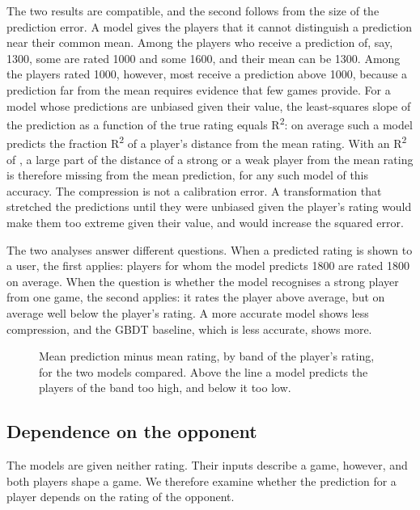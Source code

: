 \documentclass[11pt]{article}
\begin{document}
The two results are compatible, and the second follows from the size of the
prediction error. A model gives the players that it cannot distinguish a
prediction near their common mean. Among the players who receive a prediction
of, say, 1300, some are rated 1000 and some 1600, and their mean can be 1300.
Among the players rated 1000, however, most receive a prediction above 1000,
because a prediction far from the mean requires evidence that few games
provide. For a model whose predictions are unbiased given their value, the
least-squares slope of the prediction as a function of the true rating equals
R\textsuperscript{2}: on average such a model predicts the fraction
R\textsuperscript{2} of a player's distance from the mean rating. With an
R\textsuperscript{2} of , a large part of the distance of a strong
or a weak player from the mean rating is therefore missing from the mean
prediction, for any such model of this accuracy. The compression is not a
calibration error. A transformation that stretched the predictions until they
were unbiased given the player's rating would make them too extreme given
their value, and would increase the squared error.

The two analyses answer different questions. When a predicted rating is shown
to a user, the first applies: players for whom the model predicts 1800 are
rated 1800 on average. When the question is whether the model recognises a
strong player from one game, the second applies: it rates the player above
average, but on average well below the player's rating. A more accurate model
shows less compression, and the GBDT baseline, which is less accurate, shows
more.

\begin{figure}[htbp]\centering
{}
\caption{Mean prediction minus mean rating, by band of the player's rating,
for the two models compared. Above the line a model predicts the players of
the band too high, and below it too low.}
\label{fig:band-bias}
\end{figure}

\subsection{Dependence on the opponent}
\label{sec:gap}

The models are given neither rating. Their inputs describe a game, however,
and both players shape a game. We therefore examine whether the prediction
for a player depends on the rating of the opponent.
\end{document}
